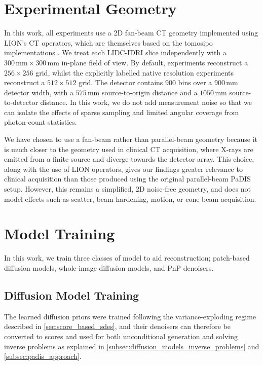 \section{Experimental Geometry}
In this work, all experiments use a 2D fan-beam CT geometry implemented using LION's CT operators, which are themselves based on the tomosipo implementations \cite{}. We treat each LIDC-IDRI slice independently with a $300\,\mathrm{mm}\times300\,\mathrm{mm}$ in-plane field of view. By default, experiments reconstruct a $256\times 256$ grid, whilst the explicitly labelled native resolution experiments reconstruct a $512\times 512$ grid. The detector contains $900$ bins over a $900\, \mathrm{mm}$ detector width, with a $575\,\mathrm{mm}$ source-to-origin distance and a $1050\,\mathrm{mm}$ source-to-detector distance. In this work, we do not add measurement noise so that we can isolate the effects of sparse sampling and limited angular coverage from photon-count statistics.

We have chosen to use a fan-beam rather than parallel-beam geometry because it is much closer to the geometry used in clinical CT acquisition, where X-rays are emitted from a finite source and diverge towards the detector array. This choice, along with the use of LION operators, gives our findings greater relevance to clinical acquisition than those produced using the original parallel-beam PaDIS setup. However, this remains a simplified, 2D noise-free geometry, and does not model effects such as scatter, beam hardening, motion, or cone-beam acquisition.

\section{Model Training}
\label{sec:methods-model-training}

In this work, we train three classes of model to aid reconstruction; patch-based diffusion models, whole-image diffusion models, and PnP denoisers. 

\subsection{Diffusion Model Training}
The learned diffusion priors were trained following the variance-exploding regime described in \autoref{sec:score_based_sdes}, and their denoisers can therefore be converted to scores and used for both unconditional generation and solving inverse problems as explained in \autoref{subsec:diffusion_models_inverse_problems} and \autoref{subsec:padis_approach}.

